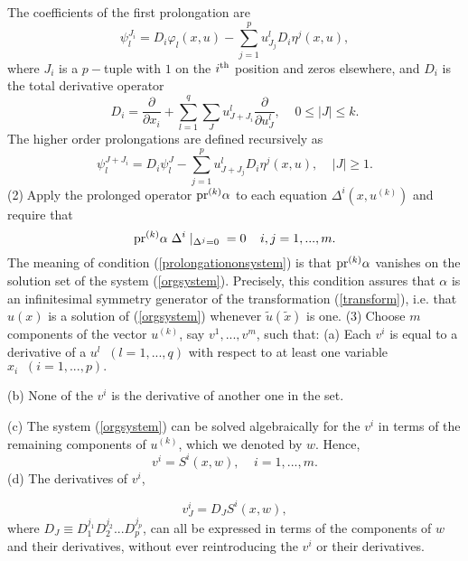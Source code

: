 {\pagebreak
\noindent
The coefficients of the first prolongation are
\begin{equation}
\psi_{l}^{J_{i}} = D_{i} \varphi_{l} (x,u) - \sum_{j=1}^{p} 
u_{J_{j}}^l D_{i} \eta^{j} (x,u), \label{psijil}
\end{equation}
where $J_{i}$ is a $p-$tuple with $1$ on the $i^{\rm th}$ position 
and zeros elsewhere, and $D_{i}$ is the total derivative operator
\begin{equation}
D_i = \frac{\partial}{\partial x_i} 
+ \sum_{l=1}^{q} \sum_J u_{J + J_{i}}^{l} \frac{\partial}
{\partial u_{J}^{l}}, \;\;\;\; 0 \leq  |J| \leq k.  \label{totalderivative}
\end{equation}
The higher order prolongations are defined recursively as
\begin{equation}
\psi_{l}^{J+J_{i}} = D_{i} \psi^{J}_{l} - \sum_{j=1}^{p} u_{J+J_{j}}^{l}
D_{i} \eta ^{j} (x,u), \;\;\;\; |J| \geq 1.
\label{psijjil}
\end{equation}
\nopagebreak
\vskip 1pt
\noindent
(2)$\;$Apply the prolonged operator ${\rm pr}^{(k)} \alpha $ to each equation
$\Delta^i (x, u^{(k)} ) $ and require that
\begin{equation}
{\rm pr}^{(k)} \alpha \; \Delta^i \mid _{\Delta^{j} = 0} \;\;  = 0 \;\;\;\; 
i,j = 1, ... , m.
\label{prolongationonsystem}
\end{equation}
The meaning of condition (\ref{prolongationonsystem}) is 
that ${\rm pr}^{(k)} \alpha $ vanishes on the solution set of the system 
(\ref{orgsystem}).
Precisely, this condition assures that $\alpha$ is an infinitesimal
symmetry generator of the transformation (\ref{transform}), i.e. that 
$u(x)$ is a solution of (\ref{orgsystem})  whenever $\tilde{u} (\tilde{x} )$
is one.
\nopagebreak
\vskip 2pt
\noindent
(3)$\;$Choose $m$ components of the vector $u^{(k)}$, 
say $ v^1 , ... , v^m $,
such that:
\nopagebreak
\vskip 2pt
\noindent
(a) Each $v^i$ is equal to a derivative of a $u^l \;\; (l = 1, ..., q)$ 
with respect to at least one variable $x_i \;\; (i = 1, ... , p). $ \par
\noindent
(b) None of the $v^i$ is the derivative of another one in the set. \par
\noindent
(c) The system (\ref{orgsystem})  can be solved algebraically for the $v^i$ 
in terms of the remaining components of $u^{(k)}$, 
which we denoted by $w$.
Hence, 
\begin{equation}
v^i = S^i (x,w), \;\;\;\; i = 1, ... , m. \label{vi}
\end{equation}
\noindent
(d) The derivatives of $v^i$, \par
\begin{equation} 
v^{i}_{J} = D_{J} S^{i} (x,w), \label{vij}
\end{equation}
\noindent
where $D_{J} \equiv D_{1}^{{j}_{1}} D_{2}^{{j}_{2}} ... D_{p}^{{j}_{p}}$,
can all be expressed in terms of the components of $w$ and their derivatives,
without ever reintroducing the $v^i$ or their derivatives. \par

}
